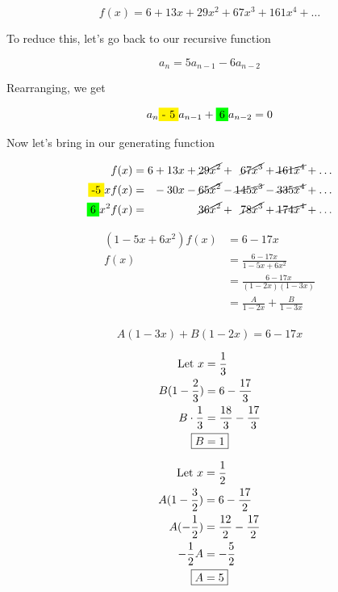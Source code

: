 \documentclass[../../Main.tex]{subfiles}
\begin{document}
$$f(x) = 6 + 13x + 29x^2 + 67x^3 + 161x^4 + \ldots$$

To reduce this, let's go back to our recursive function

$$a_n = 5a_{n - 1} - 6a_{n - 2}$$

Rearranging, we get

$$a_n \yellowbox{- 5}a_{n - 1} + \greenbox{6}a_{n - 2} = 0$$

Now let's bring in our generating function

\begin{align*}
\begin{alignedat}{6}
f(x)                    &= {} & 6   &{}+{}& 13x  &{}+{}& \cancel{29x^2} &{}+{}& \cancel{67x^3}      &{}+{}& \cancel{161x^4} + \ldots \\
\yellowbox{-5}xf(x)     &= {} &     &{}-{}& 30x  &{}-{}& \cancel{65x^2} &{}-{}& \cancel{145x^3}     &{}-{}& \cancel{335x^4} + \ldots \\
\greenbox{6}x^2f(x)     &= {} &     &{} {}&      &{} {}& \cancel{36x^2} &{}+{}& \cancel{78x^3}      &{}+{}& \cancel{174x^4} + \ldots \\
\end{alignedat}
\end{align*}

\begin{align*}
    (1 - 5x + 6x^2)f(x) &= 6 - 17x \\ 
    f(x) &= \frac{6 - 17x}{1 - 5x + 6x^2} \\
    &= \frac{6 - 17x}{(1 - 2x)(1 - 3x)} \\
    &= \frac{A}{1 - 2x} + \frac{B}{1 - 3x} \\
\end{align*}

$$A(1 - 3x) + B(1 - 2x) = 6 - 17x$$

\begin{align*}
    \text{Let } x &= \frac{1}{3} \\
    B(1 - \frac{2}{3}) &= 6 - \frac{17}{3} \\
    B \cdot \frac{1}{3} &= \frac{18}{3} - \frac{17}{3} \\
    \Aboxed{B &= 1} \\
\end{align*}

\begin{align*}
    \text{Let } x &= \frac{1}{2} \\
    A(1 - \frac{3}{2}) &= 6 - \frac{17}{2} \\
    A(-\frac{1}{2}) &= \frac{12}{2} - \frac{17}{2} \\
    -\frac{1}{2}A &= -\frac{5}{2} \\
    \Aboxed{A &= 5}
\end{align*}
\end{document}
